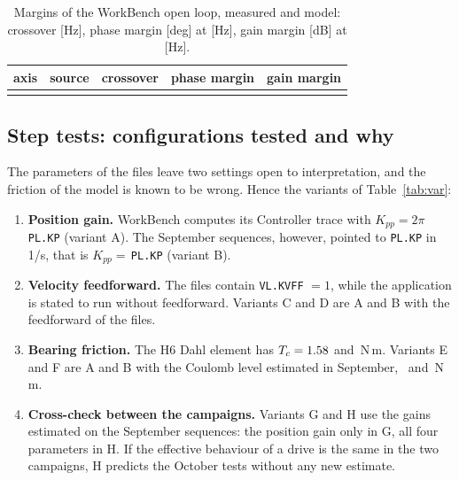 \documentclass[10pt,a4paper]{article}
\numberwithin{equation}{section}
\begin{document}
\begin{table}[H]\centering\small
\caption{Margins of the WorkBench open loop, measured and model: crossover [Hz], phase margin [deg] at [Hz], gain margin [dB] at [Hz].}\label{tab:margins}
\begin{tabular}{lllll}\toprule
axis & source & crossover & phase margin & gain margin \\ \midrule
\\ \bottomrule
\end{tabular}\end{table}

\subsection{Step tests: configurations tested and why}
The parameters of the files leave two settings open to interpretation, and the friction of the model is known to be wrong. Hence the variants of Table~\ref{tab:var}:
\begin{enumerate}
\item \textbf{Position gain.} WorkBench computes its Controller trace with $K_{pp}=2\pi$\,\texttt{PL.KP} (variant A). The September sequences, however, pointed to \texttt{PL.KP} in 1/s, that is $K_{pp}=$\,\texttt{PL.KP} (variant B).
\item \textbf{Velocity feedforward.} The files contain \texttt{VL.KVFF} $=1$, while the application is stated to run without feedforward. Variants C and D are A and B with the feedforward of the files.
\item \textbf{Bearing friction.} The H6 Dahl element has $T_c=1.58$ and \TcElHsix\,N\,m. Variants E and F are A and B with the Coulomb level estimated in September, \TcAzEst\ and \TcElEst\,N\,m.
\item \textbf{Cross-check between the campaigns.} Variants G and H use the gains estimated on the September sequences: the position gain only in G, all four parameters in H. If the effective behaviour of a drive is the same in the two campaigns, H predicts the October tests without any new estimate.
\end{enumerate}
\begin{table}[H]\centering\small
\caption{Variants of the comparison with the October step tests: $K_{pp}$ [1/s] (azimuth, elevation), $K_{pv}$ [A/(rad/s)] / $K_{iv}$ [Hz] (azimuth, elevation), velocity feedforward gain, Coulomb level $T_c$ [N\,m] (azimuth / elevation).}\label{tab:var}
\end{table}
\end{document}
